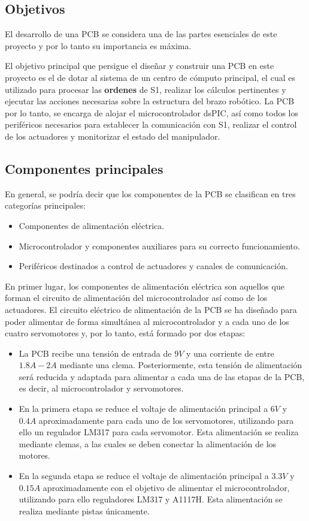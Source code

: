 \subsection{Objetivos}

El desarrollo de una \ac{PCB} se considera una de las partes esenciales de este proyecto y por lo tanto su importancia es máxima.

El objetivo principal que persigue el diseñar y construir una \ac{PCB} en este proyecto es el de dotar al sistema de un centro de cómputo principal, el cual es utilizado para procesar las \textbf{ordenes} de S1, realizar los cálculos pertinentes y ejecutar las acciones necesarias sobre la estructura del brazo robótico. La \ac{PCB} por lo tanto, se encarga de alojar el microcontrolador dsPIC, así como todos los periféricos necesarios para establecer la comunicación con S1, realizar el control de los actuadores y monitorizar el estado del manipulador.

\subsection{Componentes principales}

En general, se podría decir que los componentes de la \ac{PCB} se clasifican en tres categorías principales:
\begin{itemize}
    \item Componentes de alimentación eléctrica.
    \item Microcontrolador y componentes auxiliares para su correcto funcionamiento.
    \item Periféricos destinados a control de actuadores y canales de comunicación.
\end{itemize}

En primer lugar, los componentes de alimentación eléctrica son aquellos que forman el circuito de alimentación del microcontrolador así como de los actuadores. El circuito eléctrico de alimentación de la \ac{PCB} se ha diseñado para poder alimentar de forma simultánea al microcontrolador y a cada uno de los cuatro servomotores y, por lo tanto, está formado por dos etapas:
\begin{itemize}
    \item La \ac{PCB} recibe una tensión de entrada de $9V$ y una corriente de entre $1.8A - 2A$ mediante una clema. Posteriormente, esta tensión de alimentación será reducida y adaptada para alimentar a cada una de las etapas de la \ac{PCB}, es decir, al microcontrolador y servomotores.
    \item En la primera etapa se reduce el voltaje de alimentación principal a $6V$ y $0.4A$ aproximadamente para cada uno de los servomotores, utilizando para ello un regulador LM317 para cada servomotor. Esta alimentación se realiza mediante clemas, a las cuales se deben conectar la alimentación de los motores.
    
    \item En la segunda etapa se reduce el voltaje de alimentación principal a $3.3V$ y $0.15A$ aproximadamente con el objetivo de alimentar el microcontrolador, utilizando para ello reguladores LM317 y A1117H. Esta alimentación se realiza mediante pistas únicamente.
\end{itemize}

